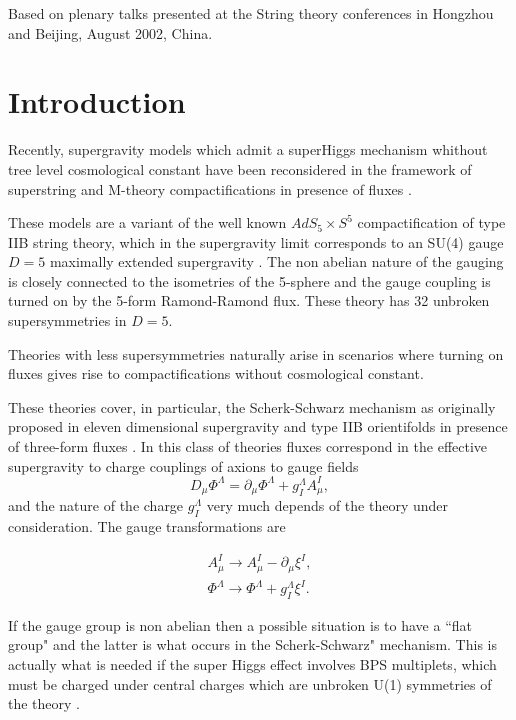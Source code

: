 \documentclass[a4paper,12pt]{article}
\begin{document}
\vskip 2cm

\noindent Based on plenary talks presented at the String theory conferences in Hongzhou and Beijing, August 
2002,  China.
\vfill\eject

\section{Introduction}

Recently, supergravity models which admit a superHiggs mechanism  whithout tree 
level cosmological constant have been reconsidered in the framework of superstring 
and M-theory compactifications in presence of fluxes \cite{ps,drs,tv,ma,cklt,gkp,fp,kst}.

These models are a variant of the well known $AdS_5\times S^5$ compactification \cite{mal,gkpo,wi} of type IIB 
string theory, which in the 
supergravity limit \cite{krvn} corresponds to an SU(4) gauge $D=5$ maximally extended supergravity 
\cite{grw,ppvn}. The non abelian nature of the 
gauging is closely connected to the isometries of the 5-sphere and the gauge coupling is turned on by the 
5-form 
Ramond-Ramond flux. These theory has 32 unbroken supersymmetries in $D=5$.

Theories with less supersymmetries naturally arise in scenarios where turning on fluxes gives rise to 
compactifications 
without cosmological constant. 

These theories cover, in particular, the Scherk-Schwarz mechanism \cite{ss,css} as originally proposed in 
eleven dimensional 
supergravity and type IIB orientifolds in presence of three-form fluxes \cite{gkp,fp,kst}. In this class of 
theories fluxes correspond in 
the effective supergravity to charge couplings of axions to gauge fields
$$D_\mu \Phi^\Lambda=\partial_\mu\Phi^\Lambda + g_I^\Lambda A_\mu^I,$$
and the nature of the charge $g^\Lambda_I$ very much depends of the theory under consideration. 
The gauge transformations are

\begin{eqnarray*}
A_\mu^I\rightarrow A_\mu^I-\partial_\mu\xi^I,\\
\Phi^\Lambda\rightarrow \Phi^\Lambda +g_I^\Lambda \xi^I.\end{eqnarray*}

If the gauge group is non abelian then a possible situation is to have a ``flat group" and the latter is what 
occurs in 
the Scherk-Schwarz" mechanism. This is actually what is needed if the super Higgs effect involves BPS 
multiplets, which 
must be charged under central charges which are unbroken U(1) symmetries of the theory \cite{adfl1}.
\end{document}
